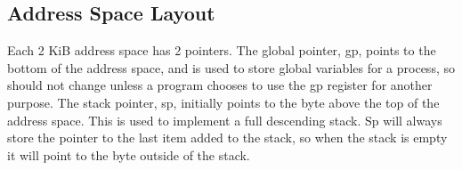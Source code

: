 \subsection{Address Space Layout}
Each 2 KiB address space has 2 pointers. The global pointer, gp, points to the bottom of the address space, and is used to store global variables for a process, so should not change unless a program chooses to use the gp register for another purpose. The stack pointer, sp, initially points to the byte above the top of the address space. This is used to implement a full descending stack. Sp will always store the pointer to the last item added to the stack, so when the stack is empty it will point to the byte outside of the stack.
